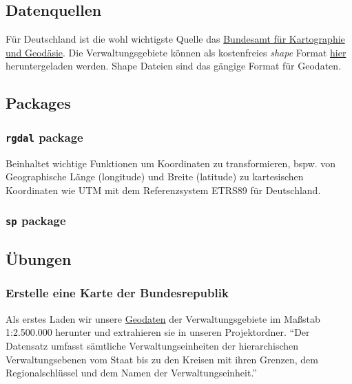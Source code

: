 \documentclass[
]{article}
\begin{document}
\hypertarget{datenquellen}{%
\subsection{Datenquellen}\label{datenquellen}}

Für Deutschland ist die wohl wichtigste Quelle das \href{https://www.bkg.bund.de/DE/Home/home.html}{Bundesamt für Kartographie und Geodäsie}. Die Verwaltungsgebiete können als kostenfreies \emph{shape} Format \href{https://gdz.bkg.bund.de/index.php/default/open-data/verwaltungsgebiete-historisch-vg-hist.html}{hier} heruntergeladen werden. Shape Dateien sind das gängige Format für Geodaten.

\hypertarget{packages}{%
\subsection{Packages}\label{packages}}

\hypertarget{rgdal-package}{%
\subsubsection{\texorpdfstring{\texttt{rgdal} package}{rgdal package}}\label{rgdal-package}}

Beinhaltet wichtige Funktionen um Koordinaten zu transformieren, bspw. von Geographische Länge (longitude) und Breite (latitude) zu kartesischen Koordinaten wie UTM mit dem Referenzsystem ETRS89 für Deutschland.

\hypertarget{sp-package}{%
\subsubsection{\texorpdfstring{\texttt{sp} package}{sp package}}\label{sp-package}}

\hypertarget{uxfcbungen}{%
\subsection{Übungen}\label{uxfcbungen}}

\hypertarget{erstelle-eine-karte-der-bundesrepublik}{%
\subsubsection{Erstelle eine Karte der Bundesrepublik}\label{erstelle-eine-karte-der-bundesrepublik}}

Als erstes Laden wir unsere \href{https://gdz.bkg.bund.de/index.php/default/digitale-geodaten/verwaltungsgebiete/verwaltungsgebiete-1-2-500-000-stand-01-01-vg2500.html}{Geodaten} der Verwaltungsgebiete im Maßstab 1:2.500.000 herunter und extrahieren sie in unseren Projektordner. ``Der Datensatz umfasst sämtliche Verwaltungseinheiten der hierarchischen Verwaltungsebenen vom Staat bis zu den Kreisen mit ihren Grenzen, dem Regionalschlüssel und dem Namen der Verwaltungseinheit.''
\end{document}
